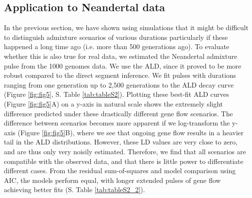 \documentclass[11pt]{article}
\begin{document}
\subsection{Application to Neandertal data}

In the previous section, we have shown using simulations that it might be difficult to distinguish admixture scenarios of various durations particularly if these happened a long time ago (i.e. more than 500 generations ago). To evaluate whether this is also true for real data, we estimated the Neandertal admixture pulse from the 1000 genomes data. We use the ALD, since it proved to be more robust compared to the direct segment inference. We fit  pulses with durations ranging from one generation up to 2,500 generations to the ALD decay curve (Figure \ref{fig:fig5}, S. Table \ref{tab:tableS2}). Plotting these best-fit ALD curves (Figure \ref{fig:fig5}A) on a y-axis in natural scale shows the extremely slight difference predicted under these drastically different gene flow scenarios. The difference between scenarios becomes more apparent if we log-transform the y-axis (Figure \ref{fig:fig5}B), where we see that ongoing gene flow results in a heavier tail in the ALD distributions. However, these LD values are very close to zero, and are thus only very noisily estimated. Therefore, we find that all scenarios are compatible with the observed data, and that there is little power to differentiate different cases. From the residual sum-of-squares and model comparison using AIC, the models perform equal, with longer extended pulses of gene flow achieving better fits (S. Table \ref{tab:tableS2_2}).
\end{document}
